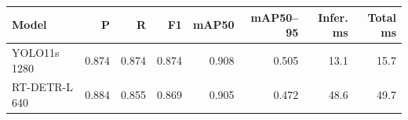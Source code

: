 \begin{tabular}{lrrrrrrr}
\hline
Model & P & R & F1 & mAP50 & mAP50--95 & Infer. ms & Total ms \\
\hline
YOLO11s 1280 & 0.874 & 0.874 & 0.874 & 0.908 & 0.505 & 13.1 & 15.7 \\
RT-DETR-L 640 & 0.884 & 0.855 & 0.869 & 0.905 & 0.472 & 48.6 & 49.7 \\
\hline
\end{tabular}
